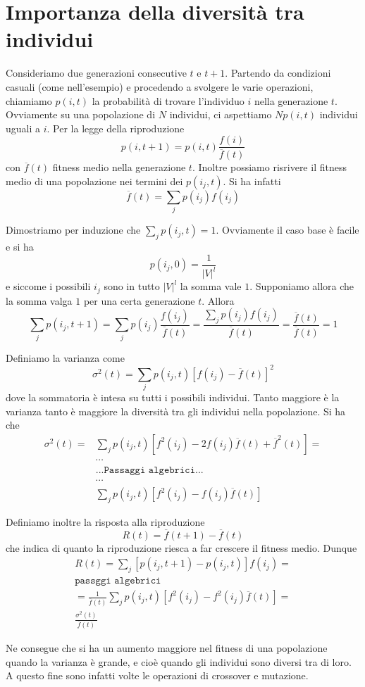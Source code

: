 \documentclass[a4paper, 11pt]{article}
\newcommand{\code}{\texttt}
\begin{document}
\section{Importanza della diversit\`a tra individui}

Consideriamo due generazioni consecutive $t$ e $t+1$. Partendo da condizioni
casuali (come nell'esempio) e procedendo a svolgere le varie operazioni,
chiamiamo $p(i,t)$ la probabilit\`a di trovare l'individuo $i$ nella
generazione $t$. Ovviamente su una popolazione di $N$ individui, ci aspettiamo
$Np(i,t)$ individui uguali a $i$. Per la legge della riproduzione
$$p(i, t+1) = p(i,t) \frac{f(i)}{\overline{f}(t)}$$
con $\overline{f}(t)$ fitness medio nella generazione $t$. Inoltre possiamo
risrivere il fitness medio di una popolazione nei termini dei $p(i_j,t)$. Si ha
infatti
$$\overline{f}(t)=\sum\limits_j p(i_j)f(i_j)$$


Dimostriamo per induzione che $\sum_j p(i_j, t)=1$. Ovviamente il caso base \`e
facile e si ha 
$$p(i_j,0)=\frac{1}{|V|^l}$$
e siccome i possibili $i_j$ sono in tutto $|V|^l$ la somma vale $1$.
Supponiamo allora che la somma valga $1$ per una certa generazione $t$. Allora
$$\sum\limits_j p(i_j,t+1) = 
\sum\limits_j p(i_j)\frac{f(i_j)}{\overline{f}(t)} = 
\frac{\sum\limits_j p(i_j)f(i_j)}{\overline{f}(t)}=
\frac{\overline{f}(t)}{\overline{f}(t)}=1$$

Definiamo la varianza come 
$$\sigma^2(t) = \sum\limits_j p(i_j, t) \left[f(i_j)- \overline{f}(t)\right]^2$$
dove la sommatoria \`e intesa su tutti i possibili individui. Tanto maggiore \`e
la varianza tanto \`e maggiore la diversit\`a tra gli individui nella
popolazione. Si ha che 
\begin{align*}
\sigma^2(t)=
    &\sum\limits_j p(i_j,t)\left[f^2(i_j) - 2f(i_j)\overline{f}
    (t)+\overline{f}^2(t)\right]=\\
    &\cdots\\
    &\code{...Passaggi algebrici...}\\
    &\cdots\\
    &\sum\limits_j p(i_j,t)\left[f^2(i_j)-f(i_j)\overline{f}(t)\right]
\end{align*}

Definiamo inoltre la risposta alla riproduzione
$$R(t) = \overline{f}(t+1)-\overline{f}(t)$$
che indica di quanto la riproduzione riesca a far crescere il fitness medio.
Dunque
\begin{align*}
R(t)=\sum\limits_j \left[p(i_j,t+1)-p(i_j,t)\right]f(i_j)=\\
    \code{passggi algebrici}\\
    =\frac{1}{\overline{f}(t)} \sum\limits_j p(i_j,t)
    \left[f^2(i_j)-f^2(i_j)\overline{f}(t)\right]=\\
    \frac{\sigma^2(t)}{\overline{f}(t)}
\end{align*}

Ne consegue che si ha un aumento maggiore nel fitness di una popolazione quando
la varianza \`e grande, e cio\`e quando gli individui sono diversi tra di loro.
A questo fine sono infatti volte le operazioni di crossover e mutazione.
\end{document}
